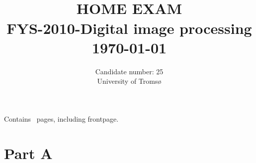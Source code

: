 

\usepackage{amssymb}
\usepackage{gensymb}
\usepackage{amsmath}



{\selectfont
\title{ \normalsize \textsc{}
		\\ [1.0cm] %
        \LARGE \textbf{\uppercase{Home Exam}
        \HRule{0.5pt} \\ [0.5cm]
        FYS-2010-Digital image processing
        \\
		\normalsize \today \vspace*{5\baselineskip}}
		}

        \date{}
\author{
		Candidate number: 25 \\ 
        University of Tromsø \\}

\clearpage\maketitle
\vspace{0.2\textheight}
{\centering
Contains \pageref{LastPage} \, pages, including frontpage.\par
}
\thispagestyle{empty}

\newpage
\tableofcontents






\newpage

\section{Part A}
}
